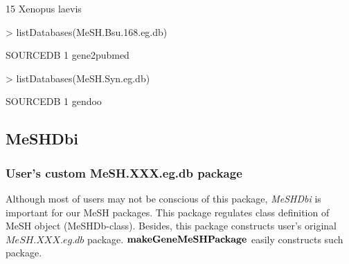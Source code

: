 \documentclass[11pt]{article}
\newcommand{\Rpackage}[1]{{\textit{#1}}}
\begin{document}
\begin{center}
\begin{Schunk}
\begin{Soutput}
15                               Xenopus laevis
\end{Soutput}
\begin{Sinput}
> listDatabases(MeSH.Bsu.168.eg.db)
\end{Sinput}
\begin{Soutput}
     SOURCEDB
1 gene2pubmed
\end{Soutput}
\begin{Sinput}
> listDatabases(MeSH.Syn.eg.db)
\end{Sinput}
\begin{Soutput}
  SOURCEDB
1   gendoo
\end{Soutput}
\end{Schunk}
\end{center}

\clearpage
\subsection{MeSHDbi}
\subsubsection{User's custom MeSH.XXX.eg.db package}
Although most of users may not be conscious of this package, \Rpackage{MeSHDbi} is important for our MeSH packages. This package regulates class definition of MeSH object (MeSHDb-class). Besides, this package constructs user's original $MeSH.XXX.eg.db$ package. $\bf{makeGeneMeSHPackage}$ easily constructs such package.
\end{document}
